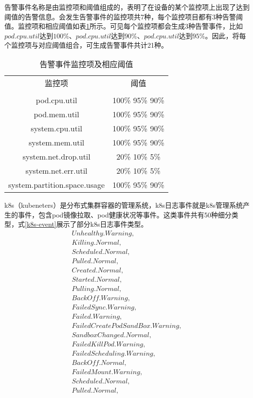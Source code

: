 告警事件名称是由监控项和阈值组成的，表明了在设备的某个监控项上出现了达到阈值的告警信息。会发生告警事件的监控项共7种，每个监控项目都有3种告警阈值。监控项和相应阈值如表\ref{alarm-event}所示。可见每个监控项都会生成3种告警事件，比如$pod.cpu.util$达到$100\%$、$pod.cpu.util$达到$90\%$、$pod.cpu.util$达到$95\%$。因此，将每个监控项与对应阈值组合，可生成告警事件共计21种。
\begin{table}[htbp]
    \centering
    \caption{告警事件监控项及相应阈值}
    \label{alarm-event}
    \begin{tabular}{cc}
    \toprule[2pt]
    监控项                          & 阈值              \\ \\\midrule[2pt]
    pod.cpu.util                 & 100\% 95\% 90\% \\
    pod.mem.util                 & 100\% 95\% 90\% \\
    system.cpu.util              & 100\% 95\% 90\% \\
    system.mem.util              & 100\% 95\% 90\% \\
    system.net.drop.util         & 20\% 10\% 5\%   \\
    system.net.err.util          & 20\% 10\% 5\%   \\
    system.partition.space.usage & 100\% 95\% 90\% \\ 
    \bottomrule[2pt]
    \end{tabular}
    \end{table}

k8s（kubeneters）是分布式集群容器的管理系统，k8s日志事件就是k8s管理系统产生的事件，包含pod镜像拉取、pod健康状况等事件。这类事件共有50种细分类型，式\ref{k8s-event}展示了部分k8s日志事件类型。
\begin{equation}
    \begin{array}{c}
        Unhealthy.Warning, \\
        Killing.Normal,\\
        Scheduled.Normal,\\
        Pulled.Normal,\\
        Created.Normal,\\
        Started.Normal,\\
        Pulling.Normal,\\
        BackOff.Warning,\\
        FailedSync.Warning,\\
        Failed.Warning,\\
        FailedCreatePodSandBox.Warning,\\
        SandboxChanged.Normal,\\
        FailedKillPod.Warning,\\
        FailedScheduling.Warning,\\
        BackOff.Normal,\\
        FailedMount.Warning,\\ 
        Scheduled.Normal,\\
        Pulled.Normal,\\
    \end{array}
    \label{k8s-event}
\end{equation}

